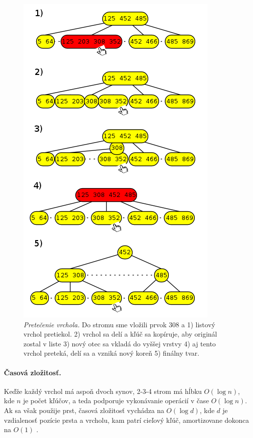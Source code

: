 \begin{figure}
\includegraphics[width=\columnwidth]{obrazky/finger-insert.png}
\caption{\emph{Pretečenie vrchola.} Do stromu sme vložili prvok $308$ a 1) listový vrchol pretiekol. 
2) vrchol sa delí a kľúč sa kopíruje, aby originál zostal v liste 3) nový otec sa vkladá do vyššej vrstvy 
4) aj tento vrchol preteká, delí sa a vzniká nový koreň 5) finálny tvar.}
\label{img:finger-insert}
\end{figure}

\paragraph{Časová zložitosť.}
Keďže každý vrchol má aspoň dvoch synov, 2-3-4 strom má hĺbku $O(\log n)$, kde $n$ je počet kľúčov, 
a teda podporuje vykonávanie operácií v čase $O(\log n)$. Ak sa však použije prst, časová zložitosť 
vychádza na $O(\log d)$, kde $d$ je vzdialenosť pozície prsta a vrcholu, kam patrí cieľový kľúč, 
amortizovane dokonca na $O(1)$ \citep{sahni}. 

